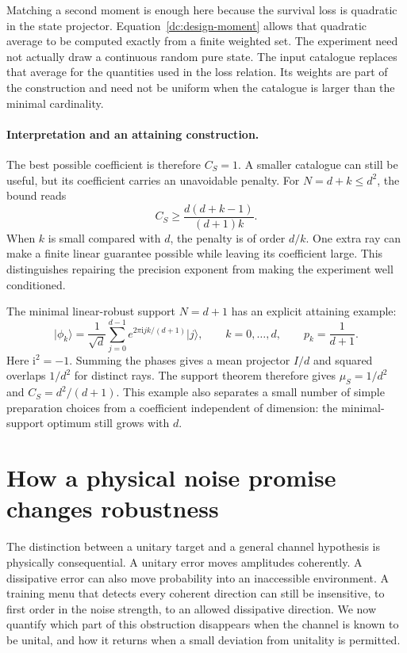 \documentclass[11pt,a4paper]{article}
\newcommand{\ket}[1]{\lvert #1\rangle}
\numberwithin{equation}{section}
\begin{document}
Matching a second moment is enough here because the survival loss is
quadratic in the state projector.  Equation~\eqref{dc:design-moment} allows
that quadratic average to be computed exactly from a finite weighted set.
The experiment need not actually draw a continuous random pure state.
The input catalogue replaces that average for the quantities used in the
loss relation.  Its weights are part of the construction and need not be
uniform when the catalogue is larger than the minimal cardinality.

\paragraph{Interpretation and an attaining construction.}

The best possible coefficient is therefore $C_S=1$.  A smaller catalogue
can still be useful, but its coefficient carries an unavoidable penalty.
For $N=d+k\leq d^2$, the bound reads
\[
 C_S\geq\frac{d(d+k-1)}{(d+1)k}.
\]
When $k$ is small compared with $d$, the penalty is of order $d/k$.
One extra ray can make a finite linear guarantee possible while leaving its
coefficient large.  This distinguishes repairing the precision exponent from
making the experiment well conditioned.


The minimal linear-robust support $N=d+1$ has an explicit attaining example:
\[
 \ket{\phi_k}=\frac1{\sqrt d}\sum_{j=0}^{d-1}
       e^{2\pi\mathrm i jk/(d+1)}\ket j,
 \qquad k=0,\ldots,d,
 \qquad p_k=\frac1{d+1}.
\]
Here $\mathrm i^2=-1$. Summing the phases gives a mean projector $I/d$
and squared overlaps $1/d^2$ for distinct rays. The support theorem therefore
gives $\mu_S=1/d^2$ and $C_S=d^2/(d+1)$. This example also separates a
small number of simple preparation choices from a coefficient independent
of dimension: the minimal-support optimum still grows with $d$.


\section{How a physical noise promise changes robustness}

The distinction between a unitary target and a general channel hypothesis is physically consequential. A unitary error moves amplitudes coherently. A dissipative error can also move probability into an inaccessible environment. A training menu that detects every coherent direction can still be insensitive, to first order in the noise strength, to an allowed dissipative direction. We now quantify which part of this obstruction disappears when the channel is known to be unital, and how it returns when a small deviation from unitality is permitted.
\end{document}
